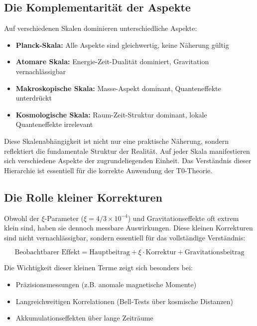 \documentclass[12pt,a4paper]{article}
\begin{document}
	\subsection{Die Komplementarität der Aspekte}
	
	Auf verschiedenen Skalen dominieren unterschiedliche Aspekte:
	\begin{itemize}
		\item \textbf{Planck-Skala:} Alle Aspekte sind gleichwertig, keine Näherung gültig
		\item \textbf{Atomare Skala:} Energie-Zeit-Dualität dominiert, Gravitation vernachlässigbar
		\item \textbf{Makroskopische Skala:} Masse-Aspekt dominant, Quanteneffekte unterdrückt
		\item \textbf{Kosmologische Skala:} Raum-Zeit-Struktur dominant, lokale Quanteneffekte irrelevant
	\end{itemize}
	
	Diese Skalenabhängigkeit ist nicht nur eine praktische Näherung, sondern reflektiert die fundamentale Struktur der Realität. Auf jeder Skala manifestieren sich verschiedene Aspekte der zugrundeliegenden Einheit. Das Verständnis dieser Hierarchie ist essentiell für die korrekte Anwendung der T0-Theorie.
	
	\subsection{Die Rolle kleiner Korrekturen}
	
	Obwohl der $\xi$-Parameter ($\xi = 4/3 \times 10^{-4}$) und Gravitationseffekte oft extrem klein sind, haben sie dennoch messbare Auswirkungen. Diese kleinen Korrekturen sind nicht vernachlässigbar, sondern essentiell für das vollständige Verständnis:
	
	\begin{equation}
		\text{Beobachtbarer Effekt} = \text{Hauptbeitrag} + \xi \cdot \text{Korrektur} + \text{Gravitationsbeitrag}
	\end{equation}
	
	Die Wichtigkeit dieser kleinen Terme zeigt sich besonders bei:
	\begin{itemize}
		\item Präzisionsmessungen (z.B. anomale magnetische Momente)
		\item Langreichweitigen Korrelationen (Bell-Tests über kosmische Distanzen)
		\item Akkumulationseffekten über lange Zeiträume
	\end{itemize}
	
\end{document}
